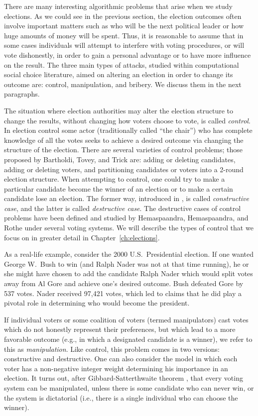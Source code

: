 There are many interesting algorithmic problems that arise when we study elections.
As we could see in the previous section, the election outcomes often involve important matters such as who will be the next political leader or how huge amounts of money will be spent.
Thus, it is reasonable to assume that in some cases individuals will attempt to interfere with voting procedures, or will vote dishonestly, in order to gain a personal advantage or to have more influence on the result.
The three main types of attacks, studied within computational social choice literature, aimed on altering an election in order to change its outcome are: control, manipulation, and bribery.
We discuss them in the next paragraphs.

The situation where election authorities may alter the election structure to change the results, without changing how voters choose to vote, is called \emph{control}.
In election control some actor (traditionally called ``the chair'') who has complete knowledge of all the votes seeks to achieve a desired outcome via changing the structure of the election.
There are several varieties of control problems; those proposed by Bartholdi, Tovey, and Trick \cite{bartholdi2} are: adding or deleting candidates, adding or deleting voters, and partitioning candidates or voters into a 2-round election structure.
When attempting to control, one could try to make a particular candidate become the winner of an election or to make a certain candidate lose an election.
The former way, introduced in \cite{bartholdi2}, is called \emph{constructive case}, and the latter is called \emph{destructive case}.
The destructive cases of control problems have been defined and studied by Hemaspaandra, Hemaspaandra, and Rothe \cite{hemaspaandra} under several voting systems.
We will describe the types of control that we focus on in greater detail in Chapter~\ref{ch:elections}.

As a real-life example, consider the 2000 U.S.\ Presidential election.
If one wanted George W.\ Bush to win (and Ralph Nader was not at that time running), he or she might have chosen to add the candidate Ralph Nader which would split votes away from Al Gore and achieve one's desired outcome.
Bush defeated Gore by 537 votes.
Nader received 97,421 votes, which led to claims that he did play a pivotal role in determining who would become the president.

If individual voters or some coalition of voters (termed manipulators) cast votes which do not honestly represent their preferences, but which lead to a more favorable outcome (e.g., in which a designated candidate is a winner), we refer to this as \emph{manipulation}.
Like control, this problem comes in two versions: constructive and destructive.
One can also consider the model in which each voter has a non-negative integer weight determining his importance in an election.
It turns out, after Gibbard-Satterthwaite theorem \cite{gibbard,satterthwaite}, that every voting system can be manipulated, unless there is some candidate who can never win, or the system is dictatorial (i.e., there is a single individual who can choose the winner).

